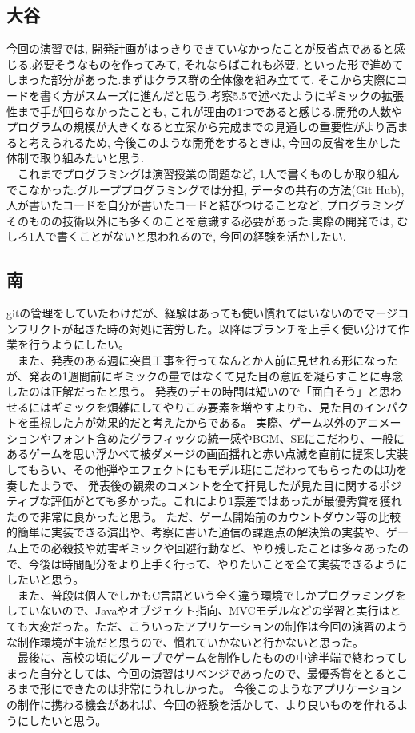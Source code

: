 \documentclass[11pt,a4j]{jarticle}
\begin{document}
\subsection{大谷}
今回の演習では, 開発計画がはっきりできていなかったことが反省点であると感じる.必要そうなものを作ってみて, それならばこれも必要, といった形で進めてしまった部分があった.まずはクラス群の全体像を組み立てて, そこから実際にコードを書く方がスムーズに進んだと思う.考察5.5で述べたようにギミックの拡張性まで手が回らなかったことも, これが理由の1つであると感じる.開発の人数やプログラムの規模が大きくなると立案から完成までの見通しの重要性がより高まると考えられるため, 今後このような開発をするときは, 今回の反省を生かした体制で取り組みたいと思う.\\
　これまでプログラミングは演習授業の問題など, 1人で書くものしか取り組んでこなかった.グループプログラミングでは分担, データの共有の方法(Git Hub), 人が書いたコードを自分が書いたコードと結びつけることなど, プログラミングそのものの技術以外にも多くのことを意識する必要があった.実際の開発では, むしろ1人で書くことがないと思われるので, 今回の経験を活かしたい.


\subsection{南}
gitの管理をしていたわけだが、経験はあっても使い慣れてはいないのでマージコンフリクトが起きた時の対処に苦労した。以降はブランチを上手く使い分けて作業を行うようにしたい。\\
　また、発表のある週に突貫工事を行ってなんとか人前に見せれる形になったが、発表の1週間前にギミックの量ではなくて見た目の意匠を凝らすことに専念したのは正解だったと思う。
発表のデモの時間は短いので「面白そう」と思わせるにはギミックを煩雑にしてやりこみ要素を増やすよりも、見た目のインパクトを重視した方が効果的だと考えたからである。
実際、ゲーム以外のアニメーションやフォント含めたグラフィックの統一感やBGM、SEにこだわり、一般にあるゲームを思い浮かべて被ダメージの画面揺れと赤い点滅を直前に提案し実装してもらい、その他弾やエフェクトにもモデル班にこだわってもらったのは功を奏したようで、
発表後の観衆のコメントを全て拝見したが見た目に関するポジティブな評価がとても多かった。これにより1票差ではあったが最優秀賞を獲れたので非常に良かったと思う。
ただ、ゲーム開始前のカウントダウン等の比較的簡単に実装できる演出や、考察に書いた通信の課題点の解決策の実装や、ゲーム上での必殺技や妨害ギミックや回避行動など、やり残したことは多々あったので、今後は時間配分をより上手く行って、やりたいことを全て実装できるようにしたいと思う。\\
　また、普段は個人でしかもC言語という全く違う環境でしかプログラミングをしていないので、Javaやオブジェクト指向、MVCモデルなどの学習と実行はとても大変だった。ただ、こういったアプリケーションの制作は今回の演習のような制作環境が主流だと思うので、慣れていかないと行かないと思った。\\
　最後に、高校の頃にグループでゲームを制作したものの中途半端で終わってしまった自分としては、今回の演習はリベンジであったので、最優秀賞をとるところまで形にできたのは非常にうれしかった。
今後このようなアプリケーションの制作に携わる機会があれば、今回の経験を活かして、より良いものを作れるようにしたいと思う。
\end{document}
